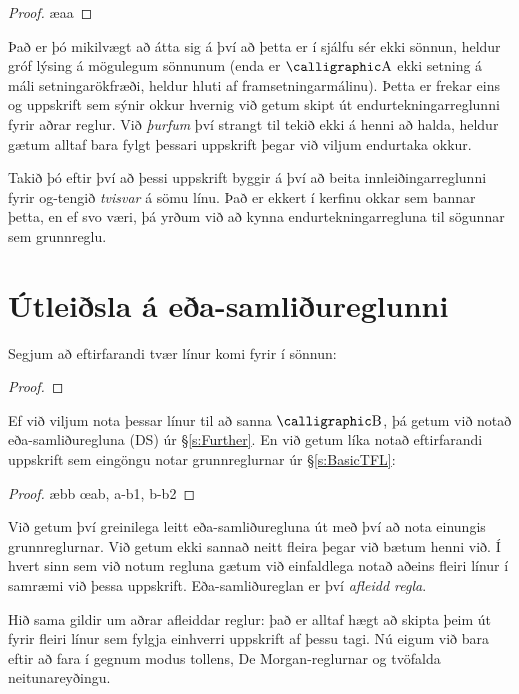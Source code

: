 \begin{proof}
	\ae{aa}
\end{proof}
Það er þó mikilvægt að átta sig á því að þetta er í sjálfu sér ekki sönnun, heldur gróf lýsing á mögulegum sönnunum (enda er $\meta{A}$ ekki setning á máli setningarökfræði, heldur hluti af framsetningarmálinu). Þetta er frekar eins og uppskrift sem sýnir okkur hvernig við getum skipt út endurtekningarreglunni fyrir aðrar reglur. Við \emph{þurfum} því strangt til tekið ekki á henni að halda, heldur gætum alltaf bara fylgt þessari uppskrift þegar við viljum endurtaka okkur.

Takið þó eftir því að þessi uppskrift byggir á því að beita innleiðingarreglunni fyrir og-tengið \emph{tvisvar} á sömu línu. Það er ekkert í kerfinu okkar sem bannar þetta, en ef svo væri, þá yrðum við að kynna endurtekningarregluna til sögunnar sem grunnreglu.

\section{Útleiðsla á eða-samliðureglunni}

Segjum að eftirfarandi tvær línur komi fyrir í sönnun:
\begin{proof}
\end{proof}
Ef við viljum nota þessar línur til að sanna $\meta{B}$, þá getum við notað eða-samliðuregluna (DS) úr \S\ref{s:Further}. En við getum líka notað eftirfarandi uppskrift sem eingöngu notar grunnreglurnar úr \S\ref{s:BasicTFL}:

	\begin{proof}
		\open
		\close
		\open
			\ae{bb}
		\close
	\oe{ab, a-b1, b-b2}
\end{proof}
Við getum því greinilega leitt eða-samliðuregluna út með því að nota einungis grunnreglurnar. Við getum ekki sannað neitt fleira þegar við bætum henni við. Í hvert sinn sem við notum regluna gætum við einfaldlega notað aðeins fleiri línur í samræmi við þessa uppskrift. Eða-samliðureglan er því \emph{afleidd regla}.

Hið sama gildir um aðrar afleiddar reglur: það er alltaf hægt að skipta þeim út fyrir fleiri línur sem fylgja einhverri uppskrift af þessu tagi. Nú eigum við bara eftir að fara í gegnum modus tollens, De Morgan-reglurnar og tvöfalda neitunareyðingu.

